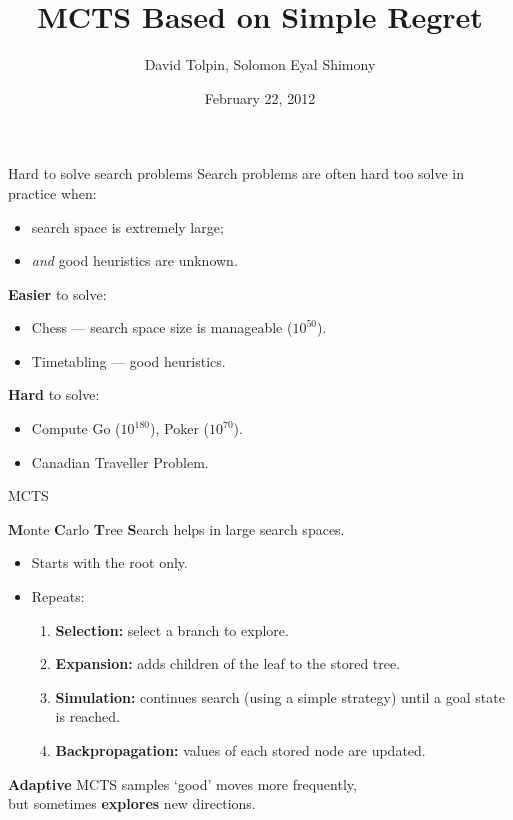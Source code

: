 \documentclass{beamer}
\title{MCTS Based on Simple Regret}
\author{David Tolpin, Solomon Eyal Shimony}
\institute{Ben-Gurion University of the Negev\\Beer Sheva, Israel}
\date{February 22, 2012}
\begin{document}
\begin{frame}
\titlepage
\end{frame}

\begin{frame}{Hard to solve search problems}
Search problems are often hard too solve in practice when:
\begin{itemize}
\item search space is extremely large;
\item {\it and} good heuristics are unknown.
\end{itemize}
\textbf{Easier} to solve:
\begin{itemize}
\item Chess --- search space size is manageable ($10^{50}$).
\item Timetabling --- good heuristics.
\end{itemize}
\textbf{Hard} to solve:
\begin{itemize}
\item Compute Go ($10^{180}$), Poker ($10^{70}$).
\item Canadian Traveller Problem.
\end{itemize}
\end{frame}

\begin{frame}{MCTS}

{\bf M}onte {\bf C}arlo {\bf T}ree {\bf S}earch helps in large search spaces.
\begin{itemize}
\item Starts with the root only.
\item Repeats:
  \begin{enumerate}
    \item \textbf{Selection:} select a branch to explore.
    \item \textbf{Expansion:} adds children of the leaf to the stored
      tree.
    \item \textbf{Simulation:} continues search (using a simple
      strategy) until a goal state is reached.
    \item \textbf{Backpropagation:} values of each stored node 
      are updated.
  \end{enumerate}
\end{itemize}
\textbf{Adaptive} MCTS samples `good' moves more frequently,\\
but sometimes {\bf explores} new directions.
\end{frame}
\end{document}
